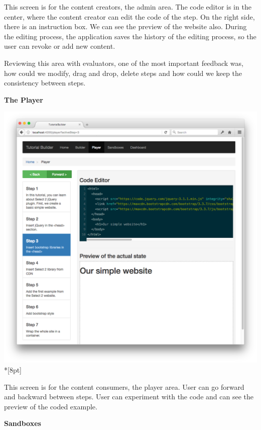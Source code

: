 \documentclass[12pt, a4paper, oneside, openright, medskipamount]{report}
\begin{document}
This screen is for the content creators, the admin area. The code editor is in the center, where the content creator can edit the code of the step. On the right side, there is an instruction box. We can see the preview of the website also. During the editing process, the application saves the history of the editing process, so the user can revoke or add new content.

Reviewing this area with evaluators, one of the most important feedback was, how could we modify, drag and drop, delete steps and how could we keep the consistency between steps.

\newpage

\textbf{The Player}

\includegraphics[width=1\textwidth]{assets/tour-screenshots/the-player.png}\\*[8pt]

This screen is for the content consumers, the player area. User can go forward and backward between steps. User can experiment with the code and can see the preview of the coded example.

\newpage

\textbf{Sandboxes}
\end{document}
